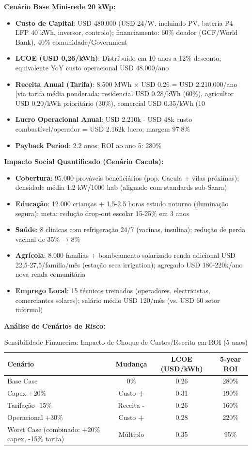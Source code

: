 \documentclass[12pt, a4paper]{article}
\begin{document}
\textbf{Cenário Base Mini-rede 20 kWp:}
\begin{itemize}
\item \textbf{Custo de Capital}: USD 480.000 (USD 24/W, incluindo PV, bateria P4-LFP 40 kWh, inversor, controlo); financiamento: 60\% doador (GCF/World Bank), 40\% comunidade/Government
\item \textbf{LCOE (USD 0,26/kWh)}: Distribuído em 10 anos a 12\% desconto; equivalente YoY custo operacional USD 48.000/ano
\item \textbf{Receita Anual (Tarifa)}: 8.500 MWh × USD 0.26 = USD 2.210.000/ano [via tarifa média ponderada: residencial USD 0.28/kWh (60\%), agricultor USD 0.20/kWh prioritário (30\%), comercial USD 0.35/kWh (10%
\item \textbf{Lucro Operacional Anual}: USD 2.210k - USD 48k custo combustível/operador = USD 2.162k lucro; margem 97.8\%
\item \textbf{Payback Period}: 2.2 anos; ROI ao ano 5: 280\%
\end{itemize}

\textbf{Impacto Social Quantificado (Cenário Cacula):}
\begin{itemize}
\item \textbf{Cobertura}: 95.000 prováveis beneficiários (pop. Cacula + vilas próximas); densidade média 1.2 kW/1000 hab (alignado com standards sub-Saara)
\item \textbf{Educação}: 12.000 crianças + 1,5-2.5 horas estudo noturno (iluminação segura); meta: redução drop-out escolar 15-25\% em 3 anos
\item \textbf{Saúde}: 8 clinicas com refrigeração 24/7 (vacinas, insulina); redução de perda vacinal de 35\% → 8\%
\item \textbf{Agrícola}: 8.000 famílias + bombeamento solarizado renda adicional USD 22,5-27,5/família/mês (estação seca irrigation); agregado USD 180-220k/ano nova renda comunitária
\item \textbf{Emprego Local}: 15 técnicos treinados (operadores, electricistas, comerciantes solares); salário médio USD 120/mês (vs. USD 60 setor informal)
\end{itemize}

\textbf{Análise de Cenários de Risco:}
\begin{table}[H]
\centering
\caption{Sensibilidade Financeira: Impacto de Choque de Custos/Receita em ROI (5-anos)}
\label{Tab:13}
\footnotesize
\begin{tabular}{lccc}
\toprule
\rowcolor{LightBlue}\textbf{Cenário} & \textbf{Mudança} & \textbf{LCOE (USD/kWh)} & \textbf{5-year ROI} \\
\midrule
Base Case & 0\% & 0.26 & 280\% \\
\midrule
Capex +20\% & Custo \textbf{+} & 0.31 & 190\% \\
\midrule
Tarifação -15\% & Receita \textbf{-} & 0.26 & 160\% \\
\midrule
Operacional +30\% & Custo \textbf{+} & 0.28 & 220\% \\
\midrule
Worst Case (combinado: +20\% capex, -15\% tarifa) & Múltiplo & 0.35 & 95\% \\
\bottomrule
\end{tabular}
\end{table}
\end{document}
